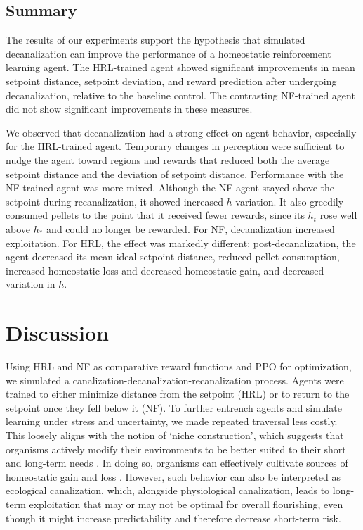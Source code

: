\documentclass[12pt,fleqn]{article}
\begin{document}
\subsection{Summary}

The results of our experiments support the hypothesis that simulated decanalization can improve the performance of a homeostatic reinforcement learning agent. The HRL-trained agent showed significant improvements in mean setpoint distance, setpoint deviation, and reward prediction after undergoing decanalization, relative to the baseline control. The contrasting NF-trained agent did not show significant improvements in these measures.

We observed that decanalization had a strong effect on agent behavior, especially for the HRL-trained agent. Temporary changes in perception were sufficient to nudge the agent toward regions and rewards that reduced both the average setpoint distance and the deviation of setpoint distance. Performance with the NF-trained agent was more mixed. Although the NF agent stayed above the setpoint during recanalization, it showed increased \(h\) variation. It also greedily consumed pellets to the point that it received fewer rewards, since its \(h_t\) rose well above \(h_*\) and could no longer be rewarded. For NF, decanalization increased exploitation. For HRL, the effect was markedly different: post-decanalization, the agent decreased its mean ideal setpoint distance, reduced pellet consumption, increased homeostatic loss and decreased homeostatic gain, and decreased variation in \(h\).

\section{Discussion}\label{model-discussion}

Using HRL and NF as comparative reward functions and PPO for optimization, we simulated a canalization-decanalization-recanalization process. Agents were trained to either minimize distance from the setpoint (HRL) or to return to the setpoint once they fell below it (NF). To further entrench agents and simulate learning under stress and uncertainty, we made repeated traversal less costly. This loosely aligns with the notion of ‘niche construction’, which suggests that organisms actively modify their environments to be better suited to their short and long-term needs \cite{pio-lopez_scale-free_2025}. In doing so, organisms can effectively cultivate sources of homeostatic gain and loss \cite{lyon_reframing_2021}. However, such behavior can also be interpreted as ecological canalization, which, alongside physiological canalization, leads to long-term exploitation that may or may not be optimal for overall flourishing, even though it might increase predictability and therefore decrease short-term risk.
\end{document}
